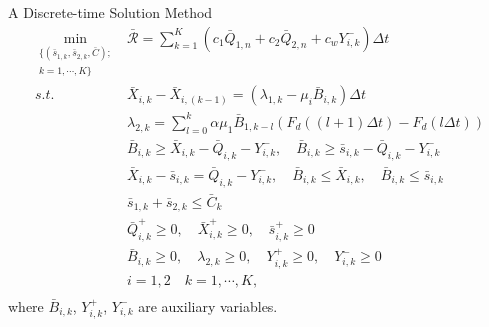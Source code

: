 \documentclass[smaller ,table,usenames,dvipsnames]{beamer}
\newcommand{\?}{\stackrel{?}{=}}
\begin{document}
\begin{frame}{A Discrete-time Solution Method}
\small
\begin{equation}\label{discrete:linearized}
\begin{array}{cl}
\displaystyle \min\limits_{\substack{ \{ (\bar{s}_{1,k},\bar{s}_{2,k},\bar{C});\\k = 1,\cdots,K \} } } &  \displaystyle \mathcal{\bar{R}}=\sum_{k=1}^K \left( c_1\bar{Q}_{1,n} + c_2\bar{Q}_{2,n} + c_w Y^-_{i,k} \right) \Delta t \\ [14pt]
\displaystyle s.t. & \displaystyle \bar{X}_{i,k} - \bar{X}_{i,(k-1)} = \left( \lambda_{1,k} - \mu_i \bar{B}_{i,k}\right)\Delta t \\ [0pt]
& \displaystyle \lambda_{2,k} =  \sum_{l=0}^k \alpha\mu_1\bar{B}_{1,k-l} \left( F_d((l+1)\Delta t) - F_d(l\Delta t) \right)  \\ [4pt]	
& \displaystyle \bar{B}_{i,k} \geq \bar{X}_{i,k} - \bar{Q}_{i,k} - Y^-_{i,k},\quad \bar{B}_{i,k} \geq \bar{s}_{i,k} - \bar{Q}_{i,k} - Y^-_{i,k} \\ [0pt]
& \displaystyle \bar{X}_{i,k} - \bar{s}_{i,k} = \bar{Q}_{i,k} - Y^-_{i,k},\quad \bar{B}_{i,k} \leq \bar{X}_{i,k}, \quad \bar{B}_{i,k} \leq \bar{s}_{i,k}\\ [0pt]
& \displaystyle \bar{s}_{1,k} + \bar{s}_{2,k} \leq \bar{C}_k \\ [0pt]
& \displaystyle \bar{Q}^+_{i,k} \geq 0,\quad \bar{X}^+_{i,k} \geq 0,\quad\bar{s}^+_{i,k} \geq 0 \\[0pt]
& \displaystyle \bar{B}_{i,k}\geq 0, \quad \lambda_{2,k} \geq 0,\quad Y^+_{i,k} \geq 0, \quad  Y^-_{i,k}\geq 0  \\[0pt]
& i=1,2\quad k=1,\cdots,K, \\
\end{array}
\end{equation}where $ \bar{B}_{i,k} $, $ Y^+_{i,k} $, $ Y^-_{i,k} $ are auxiliary variables.
\end{frame}
\end{document}

